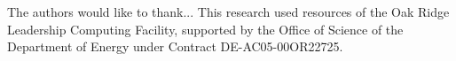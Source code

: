 The authors would like to thank... This research used resources of the Oak Ridge
Leadership Computing Facility, supported by the Office of Science of the
Department of Energy under Contract DE-AC05-00OR22725.
